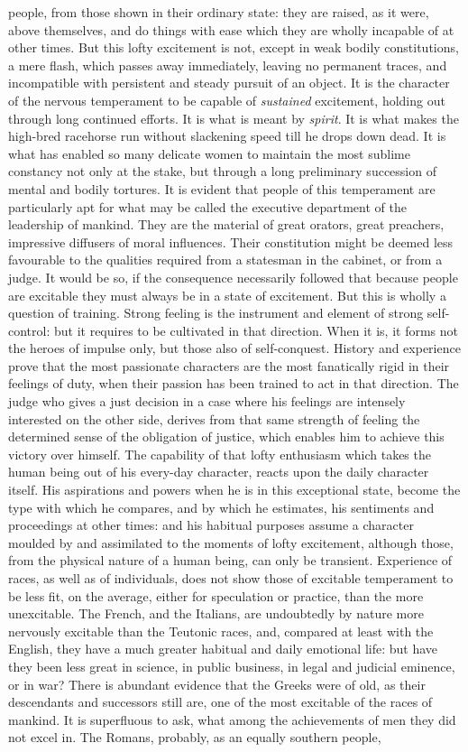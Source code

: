 \documentclass[12pt]{report}
\begin{document}
people, from those shown in their ordinary state: they are raised, as it were, above themselves, and do things with ease which they are wholly incapable of at other times. But this lofty excitement is not, except in weak bodily constitutions, a mere flash, which passes away immediately, leaving no permanent traces, and incompatible with persistent and steady pursuit of an object. It is the character of the nervous temperament to be capable of \emph{sustained} excitement, holding out through long continued efforts. It is what is meant by \emph{spirit}. It is what makes the high-bred racehorse run without slackening speed till he drops down dead. It is what has enabled so many delicate women to maintain the most sublime constancy not only at the stake, but through a long preliminary succession of mental and bodily tortures. It is evident that people of this temperament are particularly apt for what may be called the executive department of the leadership of mankind. They are the material of great orators, great preachers, impressive diffusers of moral influences. Their constitution might be deemed less favourable to the qualities required from a statesman in the cabinet, or from a judge. It would be so, if the consequence necessarily followed that because people are excitable they must always be in a state of excitement. But this is wholly a question of training. Strong feeling is the instrument and element of strong self-control: but it requires to be cultivated in that direction. When it is, it forms not the heroes of impulse only, but those also of self-conquest. History and experience prove that the most passionate characters are the most fanatically rigid in their feelings of duty, when their passion has been trained to act in that direction. The judge who gives a just decision in a case where his feelings are intensely interested on the other side, derives from that same strength of feeling the determined sense of the obligation of justice, which enables him to achieve this victory over himself. The capability of that lofty enthusiasm which takes the human being out of his every-day character, reacts upon the daily character itself. His aspirations and powers when he is in this exceptional state, become the type with which he compares, and by which he estimates, his sentiments and proceedings at other times: and his habitual purposes assume a character moulded by and assimilated to the moments of lofty excitement, although those, from the physical nature of a human being, can only be transient. Experience of races, as well as of individuals, does not show those of excitable temperament to be less fit, on the average, either for speculation or practice, than the more unexcitable. The French, and the Italians, are undoubtedly by nature more nervously excitable than the Teutonic races, and, compared at least with the English, they have a much greater habitual and daily emotional life: but have they been less great in science, in public business, in legal and judicial eminence, or in war? There is abundant evidence that the Greeks were of old, as their descendants and successors still are, one of the most excitable of the races of mankind. It is superfluous to ask, what among the achievements of men they did not excel in. The Romans, probably, as an equally southern people, 
\end{document}
